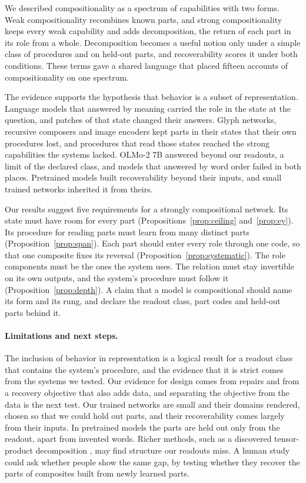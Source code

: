 We described compositionality as a spectrum of capabilities with two forms. Weak compositionality recombines known parts, and strong compositionality keeps every weak capability and adds decomposition, the return of each part in its role from a whole. Decomposition becomes a useful notion only under a simple class of procedures and on held-out parts, and recoverability scores it under both conditions. These terms gave a shared language that placed fifteen accounts of compositionality on one spectrum.

The evidence supports the hypothesis that behavior is a subset of representation. Language models that answered by meaning carried the role in the state at the question, and patches of that state changed their answers. Glyph networks, recursive composers and image encoders kept parts in their states that their own procedures lost, and procedures that read those states reached the strong capabilities the systems lacked. OLMo-2 7B answered beyond our readouts, a limit of the declared class, and models that answered by word order failed in both places. Pretrained models built recoverability beyond their inputs, and small trained networks inherited it from theirs.

Our results suggest five requirements for a strongly compositional network. Its state must have room for every part (Propositions~\ref{prop:ceiling} and~\ref{prop:ey}). Its procedure for reading parts must learn from many distinct parts (Proposition~\ref{prop:span}). Each part should enter every role through one code, so that one composite fixes its reversal (Proposition~\ref{prop:systematic}). The role components must be the ones the system uses. The relation must stay invertible on its own outputs, and the system's procedure must follow it (Proposition~\ref{prop:depth}). A claim that a model is compositional should name its form and its rung, and declare the readout class, part codes and held-out parts behind it.

\paragraph{Limitations and next steps.} The inclusion of behavior in representation is a logical result for a readout class that contains the system's procedure, and the evidence that it is strict comes from the systems we tested. Our evidence for design comes from repairs and from a recovery objective that also adds data, and separating the objective from the data is the next test. Our trained networks are small and their domains rendered, chosen so that we could hold out parts, and their recoverability comes largely from their inputs. In pretrained models the parts are held out only from the readout, apart from invented words. Richer methods, such as a discovered tensor-product decomposition \citep{mccoy2019}, may find structure our readouts miss. A human study could ask whether people show the same gap, by testing whether they recover the parts of composites built from newly learned parts.

